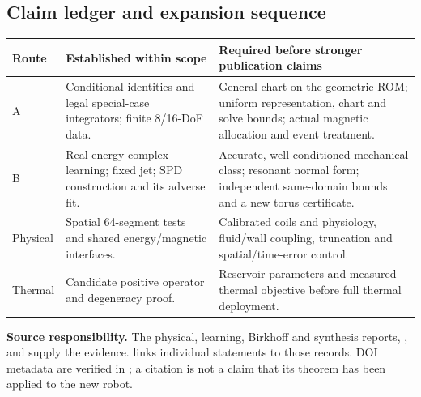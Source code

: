\subsection{Claim ledger and expansion sequence}
\begin{tabularx}{\textwidth}{@{}P{.15\textwidth}P{.2\textwidth}X@{}}
\toprule
Route & Established within scope & Required before stronger publication claims\\
\midrule
A & Conditional identities and legal special-case integrators; finite 8/16-DoF data. & General chart on the geometric ROM; uniform representation, chart and solve bounds; actual magnetic allocation and event treatment.\\
B & Real-energy complex learning; fixed jet; SPD construction and its adverse fit. & Accurate, well-conditioned mechanical class; resonant normal form; independent same-domain bounds and a new torus certificate.\\
Physical & Spatial 64-segment tests and shared energy/magnetic interfaces. & Calibrated coils and physiology, fluid/wall coupling, truncation and spatial/time-error control.\\
Thermal & Candidate positive operator and degeneracy proof. & Reservoir parameters and measured thermal objective before full thermal deployment.\\
\bottomrule
\end{tabularx}


\textbf{Source responsibility.} The physical, learning, Birkhoff and synthesis reports, , and  supply the evidence.  links individual statements to those records. DOI metadata are verified in ; a citation is not a claim that its theorem has been applied to the new robot.

\PaperPage
\small



